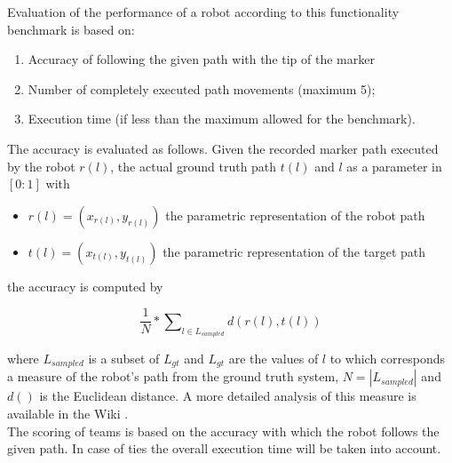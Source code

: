Evaluation of the performance of a robot according to this functionality benchmark is based on:

\begin{enumerate}
	\item Accuracy of following the given path with the tip of the marker
	\item Number of completely executed path movements (maximum 5);
	\item Execution time (if less than the maximum allowed for the benchmark).
\end{enumerate}

The accuracy is evaluated as follows. Given the recorded marker path executed by the robot $r(l)$, the actual ground truth path $t(l)$ and $l$ as a parameter in $[0:1]$ with
\begin{itemize}
	\item $r(l) = ( x_{r(l)}, y_{r(l)} )$ the parametric representation of the robot path
	\item $t(l) = ( x_{t(l)}, y_{t(l)} )$ the parametric representation of the target path
\end{itemize}

\noindent the accuracy is computed by

\begin{equation}
\frac{1}{N} * \sum\nolimits_{l \in L_{sampled}} d(r(l), t(l))
\end{equation}

\noindent where $L_{sampled}$ is a subset of $L_{gt}$ and $L_{gt}$ are the values of $l$ to which corresponds a measure of the robot's path from the ground truth system, $N = |L_{sampled}|$ and $d()$ is the Euclidean distance. A more detailed analysis of this measure is available in the \roaw Wiki \cite{rockin:wiki:2015}.\\

The scoring of teams is based on the accuracy with which the robot follows the given path. In case of ties the overall execution time will be taken into account.

